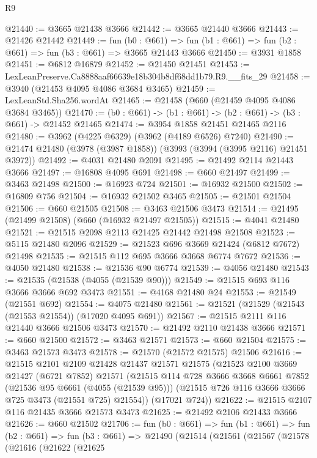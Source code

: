 \begin{lexlean}{R9}
\begin{coremodule}
@21440 := @3665 @21438 @3666
@21442 := @3665 @21440 @3666
@21443 := @21426 @21442
@21449 := fun (b0 : @661) =>
  fun (b1 : @661) => fun (b2 : @661) => fun (b3 : @661) => @3665 @21443 @3666
@21450 := @3931 @1858
@21451 := @6812 @16879
@21452 := @21450 @21451
@21453 := LexLeanPreserve.Ca8888aaf66639e18b304b8df68dd1b79.R9.__fits_29
@21458 := @3940 (@21453 @4095 @4086 @3684 @3465)
@21459 := LexLeanStd.Sha256.wordAt
@21465 := @21458 (@660 (@21459 @4095 @4086 @3684 @3465))
@21470 := (b0 : @661) -> (b1 : @661) -> (b2 : @661) -> (b3 : @661) -> @21452 @21465
@21474 := @3954 @1858 @21451 @21465 @2116
@21480 := @3962 (@4225 @6329) (@3962 (@4189 @6526) @7240)
@21490 := @21474 @21480 (@3978 (@3987 @1858)) (@3993 (@3994 (@3995 @2116) @21451 @3972))
@21492 := @4031 @21480 @2091
@21495 := @21492 @2114 @21443 @3666
@21497 := @16808 @4095 @691
@21498 := @660 @21497
@21499 := @3463 @21498
@21500 := @16923 @724
@21501 := @16932 @21500
@21502 := @16809 @756
@21504 := @16932 @21502 @3465
@21505 := @21501 @21504
@21506 := @660 @21505
@21508 := @3463 @21506 @3473
@21514 := @21495 (@21499 @21508) (@660 (@16932 @21497 @21505))
@21515 := @4041 @21480
@21521 := @21515 @2098 @2113 @21425 @21442 @21498 @21508
@21523 := @5115 @21480 @2096
@21529 := @21523 @696 @3669 @21424 (@6812 @7672) @21498
@21535 := @21515 @112 @695 @3666 @3668 @6774 @7672
@21536 := @4050 @21480
@21538 := @21536 @90 @6774
@21539 := @4056 @21480
@21543 := @21535 (@21538 (@4055 (@21539 @90)))
@21549 := @21515 @693 @116 @3666 @3666 @692 @3473
@21551 := @4168 @21480 @24
@21553 := @21549 (@21551 @692)
@21554 := @4075 @21480
@21561 := @21521 (@21529 (@21543 (@21553 @21554)) (@17020 @4095 @691))
@21567 := @21515 @2111 @116 @21440 @3666 @21506 @3473
@21570 := @21492 @2110 @21438 @3666
@21571 := @660 @21500
@21572 := @3463 @21571
@21573 := @660 @21504
@21575 := @3463 @21573 @3473
@21578 := @21570 (@21572 @21575) @21506
@21616 := @21515
    @2101
    @2109
    @21428
    @21437
    @21571
    @21575
    (@21523
      @2100
      @3669
      @21427
      (@6721 @7852)
      @21571
      (@21515
        @114
        @728
        @3666
        @3668
        @6661
        @7852
        (@21536 @95 @6661 (@4055 (@21539 @95)))
        (@21515 @726 @116 @3666 @3666 @725 @3473 (@21551 @725) @21554))
      (@17021 @724))
@21622 := @21515 @2107 @116 @21435 @3666 @21573 @3473
@21625 := @21492 @2106 @21433 @3666
@21626 := @660 @21502
@21706 := fun (b0 : @661) =>
  fun (b1 : @661) =>
  fun (b2 : @661) =>
  fun (b3 : @661) =>
  @21490
    (@21514
      (@21561
        (@21567
          (@21578
            (@21616
              (@21622
                (@21625

\end{coremodule}
\end{lexlean}

